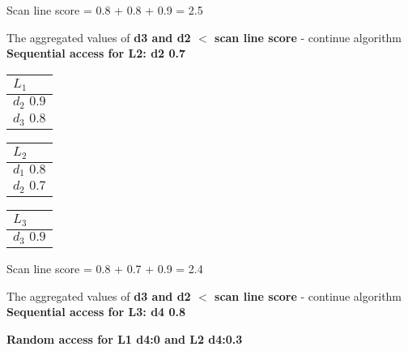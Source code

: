  Scan line score = 0.8 + 0.8 + 0.9 = 2.5

 The aggregated values of\textbf{ d3 and d2 $<$ scan line score} - continue algorithm
\\
\textbf{Sequential access for L2: d2 0.7}
 \begin{center}
    \begin{minipage}[t]{2cm}
        \begin{tabular}{|p{25pt}|}\hline
          $L_1$\\\hline
          $d_2 \, \, 0.9$\\\hline
          $d_3 \, \, 0.8$\\\hline
        \end{tabular}
    \end{minipage}
    \hspace{5mm}
    \begin{minipage}[t]{2cm}
        \begin{tabular}{|p{25pt}|}\hline
          $L_2$\\\hline
          $d_1 \, \, 0.8$\\\hline
          $d_2 \, \, 0.7$\\\hline
            \end{tabular}
    \end{minipage}
    \hspace{5mm}
    \begin{minipage}[t]{2cm}
        \begin{tabular}{|p{25pt}|}\hline
        $L_3$\\\hline
        $d_3 \, \, 0.9$\\\hline      
        \end{tabular}
    \end{minipage}
    \end{center}
\newpage

Scan line score = 0.8 + 0.7 + 0.9 = 2.4

The aggregated values of\textbf{ d3 and d2 $<$ scan line score} - continue algorithm
\\
\textbf{Sequential access for L3: d4 0.8}

\textbf{Random access for L1 d4:0 and L2 d4:0.3}

